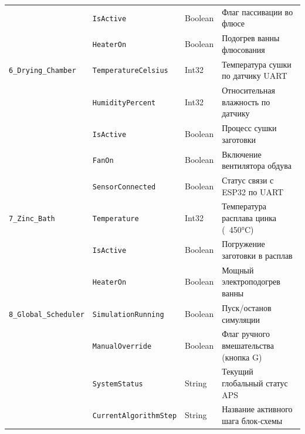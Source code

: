 \documentclass[14pt, a4paper]{extarticle}
\begin{document}
\begin{longtable}{|l|l|l|p{6cm}|}
& \texttt{IsActive} & Boolean & Флаг пассивации во флюсе \\
& \texttt{HeaterOn} & Boolean & Подогрев ванны флюсования \\
\hline
\texttt{6\_Drying\_Chamber} & \texttt{TemperatureCelsius} & Int32 & Температура сушки по датчику UART \\
& \texttt{HumidityPercent} & Int32 & Относительная влажность по датчику \\
& \texttt{IsActive} & Boolean & Процесс сушки заготовки \\
& \texttt{FanOn} & Boolean & Включение вентилятора обдува \\
& \texttt{SensorConnected} & Boolean & Статус связи с ESP32 по UART \\
\hline
\texttt{7\_Zinc\_Bath} & \texttt{Temperature} & Int32 & Температура расплава цинка (~450°C) \\
& \texttt{IsActive} & Boolean & Погружение заготовки в расплав \\
& \texttt{HeaterOn} & Boolean & Мощный электроподогрев ванны \\
\hline
\texttt{8\_Global\_Scheduler} & \texttt{SimulationRunning} & Boolean & Пуск/останов симуляции \\
& \texttt{ManualOverride} & Boolean & Флаг ручного вмешательства (кнопка G) \\
& \texttt{SystemStatus} & String & Текущий глобальный статус APS \\
& \texttt{CurrentAlgorithmStep} & String & Название активного шага блок-схемы \\
\hline
\end{longtable}
\end{document}
